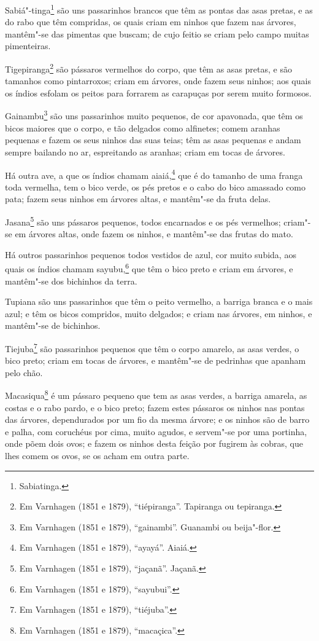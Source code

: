 \begin{linenumbers}
Sabiá"-tinga\footnote{ Sabiatinga.} são uns passarinhos brancos que têm as pontas das asas
pretas, e as do rabo que têm compridas, os quais criam em ninhos que fazem nas árvores,
mantêm"-se das pimentas que buscam; de cujo feitio se criam pelo campo muitas pimenteiras.

Tigepiranga\footnote{ Em Varnhagen (1851 e 1879), ``tiépiranga''. Tapiranga ou tepiranga.}
são pássaros vermelhos do corpo, que têm as asas pretas, e são tamanhos como pintarroxos;
criam em árvores, onde fazem seus ninhos; aos quais os índios esfolam os peitos para
forrarem as carapuças por serem muito formosos.

Gainambu\footnote{ Em Varnhagen (1851 e 1879), ``gainambi''. Guanambi ou beija"-flor.} são
uns passarinhos muito pequenos, de cor apavonada, que têm os bicos maiores que o corpo, e
tão delgados como alfinetes; comem aranhas pequenas e fazem os seus ninhos das suas teias;
têm as asas pequenas e andam sempre bailando no ar, espreitando as aranhas; criam em tocas
de árvores.

Há outra ave, a que os índios chamam aiaiá,\footnote{ Em Varnhagen (1851 e 1879),
``ayayá''. Aiaiá.} que é do tamanho de uma franga toda vermelha, tem o bico verde, os pés
pretos e o cabo do bico amassado como pata; fazem seus ninhos em árvores altas, e 
mantêm"-se da fruta delas.

Jasana\footnote{ Em Varnhagen (1851 e 1879), ``jaçanã''. Jaçanã.} são uns pássaros
pequenos, todos encarnados e os pés vermelhos; criam"-se em árvores altas, onde fazem os
ninhos, e mantêm"-se das frutas do mato.

Há outros passarinhos pequenos todos vestidos de azul, cor muito subida, aos quais os
índios chamam sayubu,\footnote{ Em Varnhagen (1851 e 1879), ``sayubui''.} que têm o bico
preto e criam em árvores, e mantêm"-se dos bichinhos da terra.

Tupiana são uns passarinhos que têm o peito vermelho, a barriga branca e o mais azul; e
têm os bicos compridos, muito delgados; e criam nas árvores, em ninhos, e mantêm"-se de
bichinhos.

Tiejuba\footnote{ Em Varnhagen (1851 e 1879), ``tiéjuba''.} são passarinhos pequenos que
têm o corpo amarelo, as asas verdes, o bico preto; criam em tocas de árvores, e mantêm"-se
de pedrinhas que apanham pelo chão.

Macasiqua\footnote{ Em Varnhagen (1851 e 1879), ``macaçica''.} é um pássaro pequeno que
tem as asas verdes, a barriga amarela, as costas e o rabo pardo, e o bico preto; fazem
estes pássaros os ninhos nas pontas das árvores, dependurados por um fio da mesma árvore;
e os ninhos são de barro e palha, com coruchéus por cima, muito agudos, e servem"-se por
uma portinha, onde põem dois ovos; e fazem os ninhos desta feição por fugirem às cobras,
que lhes comem os ovos, se os acham em outra parte.


\end{linenumbers}
